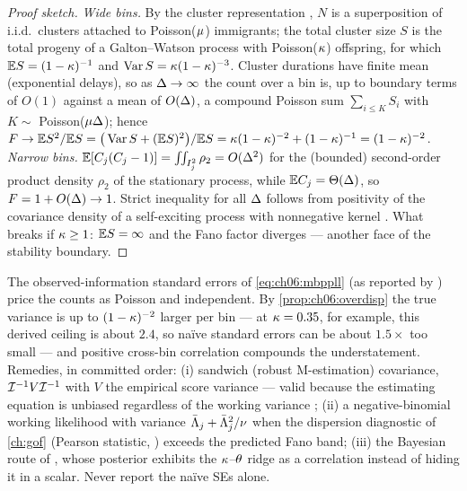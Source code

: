 \begin{proof}[Proof sketch]
\emph{Wide bins.} By the cluster representation
\citep{hawkesoakes1974}, $N$ is a superposition of i.i.d.\ clusters
attached to Poisson($\mu$) immigrants; the total cluster size $S$ is the
total progeny of a Galton--Watson process with Poisson($\kappa$)
offspring, for which $\mathbb{E} S = (1-\kappa)^{-1}$ and
$\operatorname{Var} S = \kappa(1-\kappa)^{-3}$. Cluster durations have finite mean
(exponential delays), so as $\Delta\to\infty$ the count over a bin is,
up to boundary terms of $O(1)$ against a mean of $O(\Delta)$, a compound
Poisson sum $\sum_{i\le K} S_i$ with $K\sim$ Poisson($\mu\Delta$);
hence
$F \to \mathbb{E} S^2/\mathbb{E} S = \big(\operatorname{Var} S + (\mathbb{E} S)^2\big)/\mathbb{E} S =
\kappa(1-\kappa)^{-2} + (1-\kappa)^{-1} = (1-\kappa)^{-2}$.
\emph{Narrow bins.} $\mathbb{E}[C_j(C_j-1)] = \iint_{I_j^2}\rho_2 = O(\Delta^2)$
for the (bounded) second-order product density $\rho_2$ of the stationary
process, while $\mathbb{E} C_j = \Theta(\Delta)$, so
$F = 1 + O(\Delta) \to 1$. Strict inequality for all $\Delta$ follows
from positivity of the covariance density of a self-exciting process with
nonnegative kernel \citep{hawkes1971,daley2003}. What breaks if
$\kappa \ge 1$: $\mathbb{E} S = \infty$ and the Fano factor diverges --- another
face of the stability boundary.
\end{proof}

\begin{warning}\label{warn:ch06:optimisticse}
The observed-information standard errors of \cref{eq:ch06:mbppll} (as
reported by ) price the counts as Poisson and
independent. By \cref{prop:ch06:overdisp} the true variance is up to
$(1-\kappa)^{-2}$ larger per bin --- at $\kappa = 0.35$, for example,
this derived ceiling is about $2.4$, so na\"ive standard errors can be
about $1.5\times$ too small --- and positive cross-bin correlation
compounds the understatement. Remedies, in committed order: (i) sandwich
(robust M-estimation) covariance, $\mathcal{I}^{-1} V \mathcal{I}^{-1}$ with $V$
the empirical score variance --- valid because the estimating equation is
unbiased regardless of the working variance \citep[Ch.~5]{vandervaart1998};
(ii) a negative-binomial working likelihood with variance
$\bar{\Lambda}_j + \bar{\Lambda}_j^2/\nu$ when the dispersion diagnostic of
\cref{ch:gof} (Pearson statistic, ) exceeds the
predicted Fano band; (iii) the Bayesian route of ,
whose posterior exhibits the $\kappa$--$\theta$ ridge as a correlation
instead of hiding it in a scalar. Never report the na\"ive SEs alone.
\end{warning}

